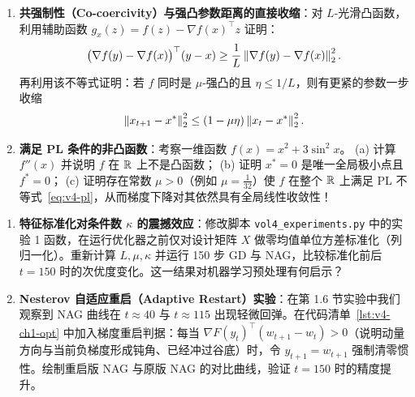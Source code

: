 \begin{enumerate}[label=\textbf{4.1.\arabic*}, leftmargin=3.3em, itemsep=5pt, start=5]
  \item\label{ex:4.1.5} \textbf{共强制性（Co-coercivity）与强凸参数距离的直接收缩}：对 $L$-光滑凸函数，利用辅助函数 $g_x(z) = f(z) - \nabla f(x)^\top z$ 证明：
  \[
    \big(\nabla f(y) - \nabla f(x)\big)^\top (y - x) \ge \frac{1}{L}\left\|\nabla f(y) - \nabla f(x)\right\|_2^2.
  \]
  再利用该不等式证明：若 $f$ 同时是 $\mu$-强凸的且 $\eta \le 1/L$，则有更紧的参数一步收缩
  \[
    \left\|x_{t+1} - x^*\right\|_2^2 \le (1 - \mu\eta)\left\|x_t - x^*\right\|_2^2.
  \]

  \item\label{ex:4.1.6} \textbf{满足 PL 条件的非凸函数}：考察一维函数 $f(x) = x^2 + 3\sin^2 x$。
  (a) 计算 $f''(x)$ 并说明 $f$ 在 $\mathbb{R}$ 上不是凸函数；
  (b) 证明 $x^* = 0$ 是唯一全局极小点且 $f^* = 0$；
  (c) 证明存在常数 $\mu > 0$（例如 $\mu = \frac{1}{32}$）使 $f$ 在整个 $\mathbb{R}$ 上满足 PL 不等式~\eqref{eq:v4-pl}，从而梯度下降对其依然具有全局线性收敛性！
\end{enumerate}

\begin{enumerate}[label=\textbf{4.1.\arabic*}, leftmargin=3.3em, itemsep=5pt, start=7]
  \item\label{ex:4.1.7} \textbf{特征标准化对条件数 $\kappa$ 的震撼效应}：修改脚本 \texttt{vol4\_experiments.py} 中的实验 1 函数，在运行优化器之前仅对设计矩阵 $X$ 做零均值单位方差标准化（列归一化）。重新计算 $L, \mu, \kappa$ 并运行 150 步 GD 与 NAG，比较标准化前后 $t=150$ 时的次优度变化。这一结果对机器学习预处理有何启示？

  \item\label{ex:4.1.8} \textbf{Nesterov 自适应重启（Adaptive Restart）实验}：在第 1.6 节实验中我们观察到 NAG 曲线在 $t \approx 40$ 与 $t \approx 115$ 出现轻微回弹。在代码清单~\ref{lst:v4-ch1-opt} 中加入梯度重启判据：每当 $\nabla F(y_t)^\top (w_{t+1} - w_t) > 0$（说明动量方向与当前负梯度形成钝角、已经冲过谷底）时，令 $y_{t+1} = w_{t+1}$ 强制清零惯性。绘制重启版 NAG 与原版 NAG 的对比曲线，验证 $t=150$ 时的精度提升。
\end{enumerate}
